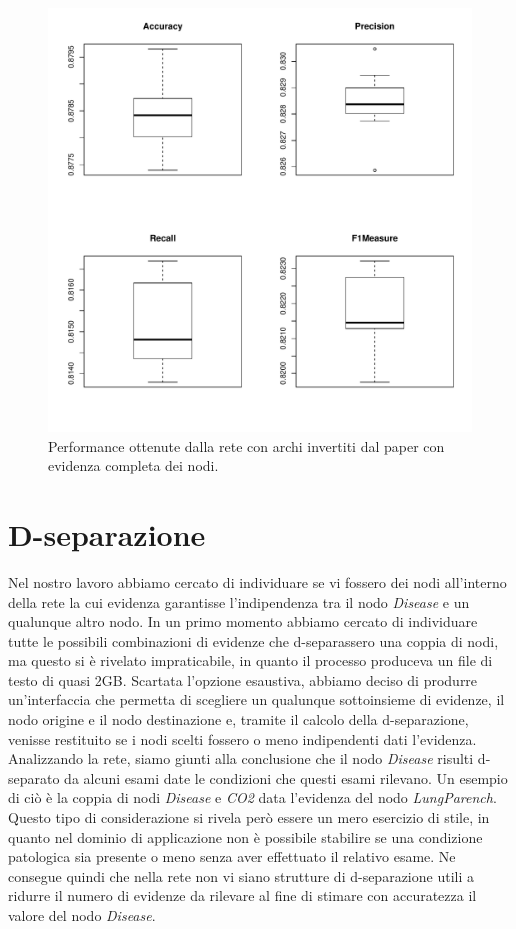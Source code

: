 \begin{figure}
	\centering
	\includegraphics[width=0.7\linewidth]{images/reversed_performance}
	\caption{Performance ottenute dalla rete con archi invertiti dal paper con evidenza completa dei nodi.}
	\label{fig:reversedperformance}
\end{figure}


\section{D-separazione}
Nel nostro lavoro abbiamo cercato di individuare se vi fossero dei nodi all'interno della rete la cui evidenza garantisse l'indipendenza tra il nodo \textit{Disease} e un qualunque altro nodo. In un primo momento abbiamo cercato di individuare tutte le possibili combinazioni di evidenze che d-separassero una coppia di nodi, ma questo si è rivelato impraticabile, in quanto il processo produceva un file di testo di quasi 2GB. Scartata l'opzione esaustiva, abbiamo deciso di produrre un'interfaccia che permetta di scegliere un qualunque sottoinsieme di evidenze, il nodo origine e il nodo destinazione e, tramite il calcolo della d-separazione, venisse restituito se i nodi scelti fossero o meno indipendenti dati l'evidenza. 
Analizzando la rete, siamo giunti alla conclusione che il nodo \textit{Disease} risulti d-separato da alcuni esami date le condizioni che questi esami rilevano. Un esempio di ciò è la coppia di nodi \textit{Disease} e \textit{CO2} data l'evidenza del nodo \textit{LungParench}. Questo tipo di considerazione si rivela però essere un mero esercizio di stile, in quanto nel dominio di applicazione non è possibile stabilire se una condizione patologica sia presente o meno senza aver effettuato il relativo esame. Ne consegue quindi che nella rete non vi siano strutture di d-separazione utili a ridurre il numero di evidenze da rilevare al fine di stimare con accuratezza il valore del nodo \textit{Disease}.

